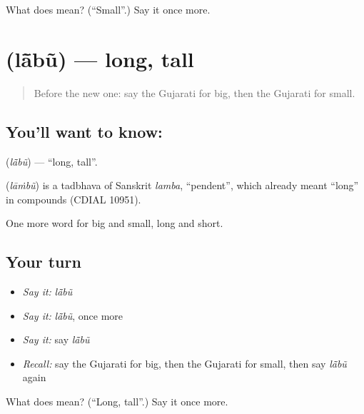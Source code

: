 \begin{tcolorbox}[breakable,colback=teal!4,colframe=teal!35!black,title={Before you move on}]
What does  mean? (\textquotedblleft{}Small\textquotedblright{}.) Say it once more.
\end{tcolorbox}
\section[\texorpdfstring{\gu{લાંબું} (lā̃bũ)}{લાંબું (lā̃bũ)}]{ (lā̃bũ) — long, tall}

\label{lesson:GU-C72-long}



\begin{quote}
Before the new one: say the Gujarati for big, then the Gujarati for small.
\end{quote}

\subsection*{You'll want to know: }
\textbf{} (\emph{lā̃bũ}) — \textquotedblleft{}long, tall\textquotedblright{}.

\begin{cousinweb}
\textbf{} (\emph{lāṁbũ}) is a tadbhava of Sanskrit \emph{lamba}, \textquotedblleft{}pendent\textquotedblright{}, which already meant \textquotedblleft{}long\textquotedblright{} in compounds (CDIAL 10951).
\end{cousinweb}

\begin{grammarlens}[title={What you've built}]
One more word for big and small, long and short.
\end{grammarlens}

\subsection*{Your turn}
\begin{itemize}
\raggedright
  \item \emph{Say it:} \emph{lā̃bũ}
  \item \emph{Say it:} \emph{lā̃bũ}, once more
  \item \emph{Say it:} say \emph{lā̃bũ}
  \item \emph{Recall:} say the Gujarati for big, then the Gujarati for small, then say \emph{lā̃bũ} again
\end{itemize}

\begin{tcolorbox}[breakable,colback=teal!4,colframe=teal!35!black,title={Before you move on}]
What does  mean? (\textquotedblleft{}Long, tall\textquotedblright{}.) Say it once more.
\end{tcolorbox}
